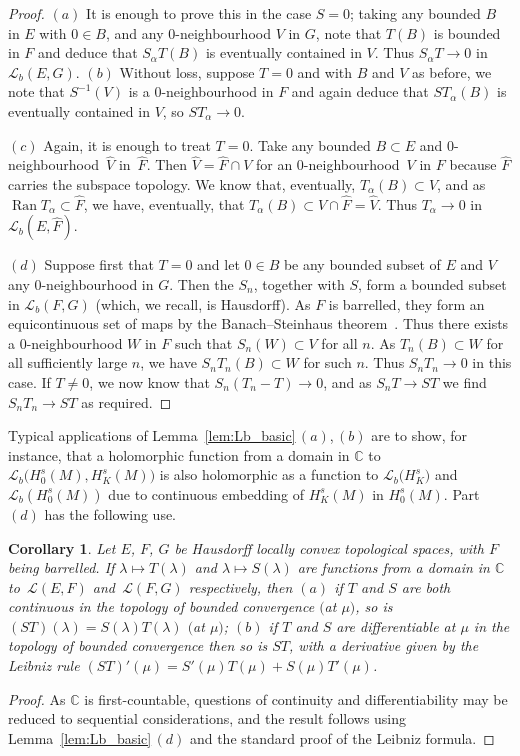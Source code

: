 \documentclass[11pt]{article}
\numberwithin{equation}{section}
\numberwithin{equation}{section}
\newtheorem{Corollary}[Theorem]{Corollary}
\newcommand{\CC}{{\mathbb C}}
\newcommand{\LL}{{\mathcal L}}
\newcommand{\Ran}{\operatorname{Ran}}
\begin{document}
 \begin{proof}
 	$(a)$ It is enough to prove this in the case $S=0$; taking any bounded $B$ in $E$ with $0\in B$, and any $0$-neighbourhood $V$ in $G$, note that $T(B)$ is bounded in $F$ and deduce that $S_\alpha T(B)$ is eventually contained in $V$. Thus $S_\alpha T\to 0$ in $\LL_b(E,G)$. $(b)$ Without loss, suppose $T=0$ and with $B$ and $V$ as before, we note that $S^{-1}(V)$ is a $0$-neighbourhood in $F$ and again deduce that $ST_\alpha(B)$ is eventually contained in $V$, so $ST_\alpha\to 0$.
 	
 	$(c)$ Again, it is enough to treat $T=0$. Take any bounded $B\subset E$ and $0$-neighbourhood~$\hat{V}$ in~$\hat{F}$. Then $\hat{V}=\hat{F}\cap V$ for an $0$-neighbourhood~$V$ in $F$ because $\hat{F}$ carries the subspace topology. We know that, eventually, $T_\alpha(B)\subset V$, and as $\Ran T_\alpha\subset \hat{F}$, we have, eventually, that $T_\alpha(B)\subset V\cap\hat{F}= \hat{V}$. Thus $T_\alpha\to 0$ in $\LL_b(E,\hat{F})$.
 	
 	$(d)$ Suppose first that $T=0$ and let $0\in B$
 	be any bounded subset of $E$ and $V$ any $0$-neighbourhood in $G$. Then
 	the $S_n$, together with $S$, form a bounded subset in $\LL_b(F,G)$ (which, we recall, is Hausdorff). As $F$ is barrelled, they form an equicontinuous set of maps by the Banach--Steinhaus theorem~\cite[Theorem 33.1]{Treves:TVS}. Thus there exists
 	a $0$-neighbourhood $W$ in $F$ such that $S_n (W)\subset V$ for all $n$.
 	As $T_n(B)\subset W$ for all sufficiently large $n$, we have $S_nT_n(B)\subset W$ for such $n$. Thus $S_nT_n\to 0$ in this case. If $T\neq 0$, we now know
 	that $S_n(T_n-T)\to 0$, and as $S_n T\to ST$ we find $S_nT_n\to ST$ as required.
 \end{proof}

 Typical applications of Lemma~\ref{lem:Lb_basic}\,$(a)$,\,$(b)$ are to show, for instance, that a holomorphic function from a domain in $\CC$ to $\LL_b\big(H^s_0(M),H^s_K(M)\big)$ is also holomorphic as a function to $\LL_b\big(H^s_K\big)$ and
 $\LL_b(H^s_0(M))$ due to continuous embedding of $H_K^s(M)$ in $H^s_0(M)$. Part~$(d)$ has the following use.
 \begin{Corollary}\label{cor:Leibniz}
 	Let $E$, $F$, $G$ be Hausdorff locally convex topological spaces, with $F$ being barrelled.
 	If $\lambda\mapsto T(\lambda)$ and $\lambda\mapsto S(\lambda)$ are functions from a domain in $\CC$ to~$\LL(E,F)$ and~$\LL(F,G)$ respectively, then $(a)$ if $T$ and $S$ are both continuous in the topology of bounded convergence $($at $\mu$$)$, so is $(ST)(\lambda)=S(\lambda)T(\lambda)$ $($at $\mu$$)$; $(b)$ if $T$ and $S$ are differentiable at $\mu$ in the topology of bounded convergence then so is $ST$, with a derivative given by the Leibniz rule
 	$(ST)'(\mu)=S'(\mu)T(\mu) + S(\mu)T'(\mu)$.
 \end{Corollary}
 \begin{proof}
 	As $\CC$ is first-countable, questions of continuity and differentiability may be reduced to sequential considerations, and the result follows using Lemma~\ref{lem:Lb_basic}\,$(d)$ and the standard proof of the Leibniz formula.
 \end{proof}
\end{document}
